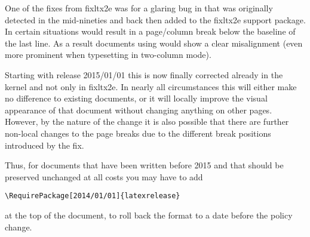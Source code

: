 \documentclass{ltnews}
\begin{document}
One of the fixes from \textsf{fixltx2e} was for a glaring bug in
 that was originally detected in the mid-nineties and
back then added to the \textsf{fixltx2e} support package. In certain
situations  would result in a page/column break below
the baseline of the last line. As a result documents using
 would show a clear misalignment (even more prominent
when typesetting in two-column mode).

Starting with release 2015/01/01 this is now finally corrected already
in the kernel and not only in \textsf{fixltx2e}.  In nearly all
circumstances this will either make no difference to existing
documents, or it will locally improve the visual appearance of that
document without changing anything on other pages.  However, by the
nature of the change it is also possible that there are further
non-local changes to the page breaks due to the different break
positions introduced by the fix.

Thus, for documents that have been written before 2015 and that should
be preserved unchanged at all costs you may have to add
\begin{verbatim}
\RequirePackage[2014/01/01]{latexrelease}
\end{verbatim}
at the top of the document, to roll back the format to a date before
the policy change.
\end{document}
